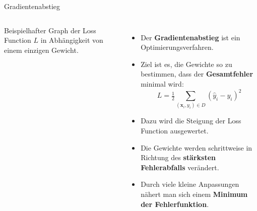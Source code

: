 \begin{frame}{Gradientenabstieg}

\begin{columns}
\centering

\par \vspace{0.2cm}
{\scriptsize Beispielhafter Graph der Loss Function $L$ in Abhängigkeit von einem einzigen Gewicht.}

\footnotesize
\begin{itemize}
    \item Der \textbf{Gradientenabstieg} ist ein Optimierungsverfahren.

    \item Ziel ist es, die Gewichte so zu bestimmen, dass der \textbf{Gesamtfehler} minimal wird:
    \[
      L = \tfrac12\sum_{(\mathbf{x}_i,y_i)\in D}
      (\hat{y}_i-y_i)^2
    \]

    \item Dazu wird die Steigung der Loss Function ausgewertet.

    \item Die Gewichte werden schrittweise in Richtung des \textbf{stärksten Fehlerabfalls} verändert.

    \item Durch viele kleine Anpassungen nähert man sich einem \textbf{Minimum der Fehlerfunktion}.
\end{itemize}

\end{columns}
\end{frame}

